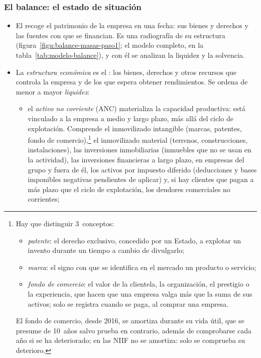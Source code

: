 \documentclass[11pt]{article}
\begin{document}
\subsubsection{El balance: el estado de situación}\label{sec:balance}

\begin{itemize}
\item El  recoge el patrimonio de la empresa en una fecha: sus bienes y derechos y las fuentes con que se financian. Es una radiografía de su estructura (figura~\ref{figu:balance-masas-paso1}; el modelo completo, en la tabla~\ref{tab:modelo-balance}), y con él se analizan la liquidez y la solvencia.
\item La \emph{estructura económica} es el : los bienes, derechos y otros recursos que controla la empresa y de los que espera obtener rendimientos. Se ordena de menor a mayor \emph{liquidez}:
  \begin{itemize}
  \item el \emph{activo no corriente} (ANC) materializa la capacidad productiva: está vinculado a la empresa a medio y largo plazo, más allá del ciclo de explotación. Comprende el inmovilizado intangible (marcas, patentes, fondo de comercio),\footnote{Hay que distinguir 3~conceptos:
\begin{itemize}
\item \emph{patente}: el derecho exclusivo, concedido por un Estado, a explotar un invento durante un tiempo a cambio de divulgarlo;
\item \emph{marca}: el signo con que se identifica en el mercado un producto o servicio;
\item \emph{fondo de comercio}: el valor de la clientela, la organización, el prestigio o la experiencia, que hacen que una empresa valga más que la suma de sus activos; solo se registra cuando se paga, al comprar una empresa.
\end{itemize}
El fondo de comercio, desde 2016, se amortiza durante su vida útil, que se presume de 10~años salvo prueba en contrario, además de comprobarse cada año si se ha deteriorado\nocite{BOE2016RD602}; en las NIIF no se amortiza: solo se comprueba su deterioro.} el inmovilizado material (terrenos, construcciones, instalaciones), las inversiones inmobiliarias (inmuebles que no se usan en la actividad), las inversiones financieras a largo plazo, en empresas del grupo y fuera de él, los activos por impuesto diferido (deducciones y bases imponibles negativas pendientes de aplicar) y, si hay clientes que pagan a más plazo que el ciclo de explotación, los deudores comerciales no corrientes;

\end{itemize}
\end{itemize}
\end{document}

